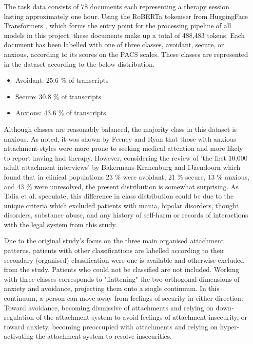 \documentclass[12pt]{report}
\begin{document}
The task data consists of 78 documents each representing a therapy session lasting approximately one hour.
Using the RoBERTa tokeniser from HuggingFace Transformers \cite{HuggingFace}, which forms the entry point for the processing pipeline of all models in this project, these documents make up a total of 488,483 tokens.
Each document has been labelled with one of three classes, avoidant, secure, or anxious, according to its scores on the PACS scales.
These classes are represented in the dataset according to the below distribution.
\begin{itemize}
    \item {Avoidant: 25.6 \% of transcripts}
    \item {Secure: 30.8 \% of transcripts}
    \item {Anxious: 43.6 \% of transcripts}
\end{itemize}
Although classes are reasonably balanced, the majority class in this dataset is anxious.
As noted, it was shown by Feeney and Ryan \citeyear{Feeney1994} that those with anxious attachment styles were more prone to seeking medical attention and more likely to report having had therapy.
However, considering the review of 'the first 10,000 adult attachment interviews' by Bakermans-Kranenburg and IJzendoorn \citeyear{Bakermanskranenburg2009} which found that in clinical populations 23 \% were avoidant, 21 \% secure, 13 \% anxious, and 43 \% were unresolved, the present distribution is somewhat surprising.
As Talia et al. \citeyear{Talia2017} speculate, this difference in class distribution could be due to the unique criteria which excluded patients with mania, bipolar disorders, thought disorders, substance abuse, and any history of self-harm or records of interactions with the legal system from this study.

Due to the original study's focus on the three main organised attachment patterns, patients with other classifications are labelled according to their secondary (organised) classification were one is available and otherwise excluded from the study.
Patients who could not be classified are not included.
Working with three classes corresponds to "flattening" the two orthogonal dimensions of anxiety and avoidance, projecting them onto a single continuum.
In this continuum, a person can move away from feelings of security in either direction: Toward avoidance, becoming dismissive of attachments and relying on down-regulation of the attachment system to avoid feelings of attachment insecurity, or toward anxiety, becoming preoccupied with attachments and relying on hyper-activating the attachment system to resolve insecurities.
\end{document}
